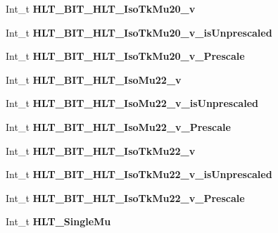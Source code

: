 \begin{DoxyCompactItemize}
\hypertarget{classMiniTree_aa97d8f6b7892520cc430113e1d85d4c0}{}\label{classMiniTree_aa97d8f6b7892520cc430113e1d85d4c0} 
Int\+\_\+t {\bfseries H\+L\+T\+\_\+\+B\+I\+T\+\_\+\+H\+L\+T\+\_\+\+Iso\+Tk\+Mu20\+\_\+v}
\item 
\hypertarget{classMiniTree_a67646db86ad93cbfc36a8690699aea2e}{}\label{classMiniTree_a67646db86ad93cbfc36a8690699aea2e} 
Int\+\_\+t {\bfseries H\+L\+T\+\_\+\+B\+I\+T\+\_\+\+H\+L\+T\+\_\+\+Iso\+Tk\+Mu20\+\_\+v\+\_\+is\+Unprescaled}
\item 
\hypertarget{classMiniTree_aa5f4ed55a1e094193c4007c1ced5fc00}{}\label{classMiniTree_aa5f4ed55a1e094193c4007c1ced5fc00} 
Int\+\_\+t {\bfseries H\+L\+T\+\_\+\+B\+I\+T\+\_\+\+H\+L\+T\+\_\+\+Iso\+Tk\+Mu20\+\_\+v\+\_\+\+Prescale}
\item 
\hypertarget{classMiniTree_a2eea14377400f65dff3c833142fb8910}{}\label{classMiniTree_a2eea14377400f65dff3c833142fb8910} 
Int\+\_\+t {\bfseries H\+L\+T\+\_\+\+B\+I\+T\+\_\+\+H\+L\+T\+\_\+\+Iso\+Mu22\+\_\+v}
\item 
\hypertarget{classMiniTree_a4005e4e4127e8750e3fb76be1ad3d981}{}\label{classMiniTree_a4005e4e4127e8750e3fb76be1ad3d981} 
Int\+\_\+t {\bfseries H\+L\+T\+\_\+\+B\+I\+T\+\_\+\+H\+L\+T\+\_\+\+Iso\+Mu22\+\_\+v\+\_\+is\+Unprescaled}
\item 
\hypertarget{classMiniTree_ad78a815cab14a533a54ed86576e7d68a}{}\label{classMiniTree_ad78a815cab14a533a54ed86576e7d68a} 
Int\+\_\+t {\bfseries H\+L\+T\+\_\+\+B\+I\+T\+\_\+\+H\+L\+T\+\_\+\+Iso\+Mu22\+\_\+v\+\_\+\+Prescale}
\item 
\hypertarget{classMiniTree_a5ecfa397fb9dbe50e11edca7f669da3d}{}\label{classMiniTree_a5ecfa397fb9dbe50e11edca7f669da3d} 
Int\+\_\+t {\bfseries H\+L\+T\+\_\+\+B\+I\+T\+\_\+\+H\+L\+T\+\_\+\+Iso\+Tk\+Mu22\+\_\+v}
\item 
\hypertarget{classMiniTree_a33d0d7644d089dde8199f8eea55b70f2}{}\label{classMiniTree_a33d0d7644d089dde8199f8eea55b70f2} 
Int\+\_\+t {\bfseries H\+L\+T\+\_\+\+B\+I\+T\+\_\+\+H\+L\+T\+\_\+\+Iso\+Tk\+Mu22\+\_\+v\+\_\+is\+Unprescaled}
\item 
\hypertarget{classMiniTree_aea9840f3aafb1d7c87a92d4d4f917236}{}\label{classMiniTree_aea9840f3aafb1d7c87a92d4d4f917236} 
Int\+\_\+t {\bfseries H\+L\+T\+\_\+\+B\+I\+T\+\_\+\+H\+L\+T\+\_\+\+Iso\+Tk\+Mu22\+\_\+v\+\_\+\+Prescale}
\item 
\hypertarget{classMiniTree_a8fafdf820b0328fa50876745316340af}{}\label{classMiniTree_a8fafdf820b0328fa50876745316340af} 
Int\+\_\+t {\bfseries H\+L\+T\+\_\+\+Single\+Mu}
\item 

\end{DoxyCompactItemize}
